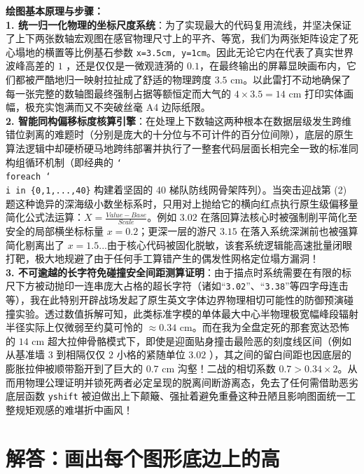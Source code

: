 {\small\color{blue!70!black}
\textbf{绘图基本原理与步骤：}\\
\textbf{1. 统一归一化物理的坐标尺度系统}：为了实现最大的代码复用流线，并坚决保证了上下两张数轴宏观图在感官物理尺寸上的平齐、等宽，我们为两张矩阵设定了死心塌地的横置等比例基石参数 \texttt{x=3.5cm, y=1cm}。因此无论它内在代表了真实世界波峰高差的 $1$ ，还是仅仅是一微观涟漪的 $0.1$，在最终输出的屏幕显映画布内，它们都被严酷地归一映射拉扯成了舒适的物理跨度 $3.5\text{ cm}$。以此雷打不动地确保了每一张完整的数轴图最终强制占据等额恒定而大气的 $4 \times 3.5 = 14\text{ cm}$ 打印实体画幅，极充实饱满而又不突破丝毫 A4 边际纸限。\\
\textbf{2. 智能同构偏移标度核算引擎}：在处理上下数轴这两种根本在数据层级发生跨维错位剥离的难题时（分别是庞大的十分位与不可计件的百分位间隙），底层的原生算法逻辑中却硬桥硬马地跨纬部署并执行了一整套代码层面长相完全一致的标准同构组循环机制（即经典的 \texttt{\char`\\foreach \char`\\i in \{0,1,...,40\}} 构建着坚固的 40 梯队防线网骨架阵列）。当突击迎战第 (2) 题这种诡异的深海级小数坐标系时，只用对上抛给它的横向红点执行原生级偏移量简化公式法运算：$X = \frac{Value - Base}{Scale}$。例如 $3.02$ 在落回算法核心时被强制削平简化至安全的局部横坐标标量 $x = 0.2$；更深一层的游尺 $3.15$ 在落入系统深渊前也被强算简化剔离出了 $x = 1.5$...由于核心代码被固化脱敏，该套系统逻辑能高速批量闭眼打靶，极大地规避了由于任何手工算错产生的偶发性网格定位塌方漏洞！\\
\textbf{3. 不可逾越的长字符免碰撞安全间距测算证明}：由于描点时系统需要在有限的标尺下方被动抛印一连串庞大占格的超长字符（诸如“\texttt{3.02}”、“\texttt{3.38}”等四字母连击等），我在此特别开辟战场发起了原生英文字体边界物理相切可能性的防御预演碰撞实验。透过数值拆解可知，此类标准字模的单体最大中心半物理极宽幅峰段辐射半径实际上仅微弱至约莫可怜的 $\approx0.34\text{ cm}$。而在我为全盘定死的那套宽达恐怖的 $14\text{ cm}$ 超大拉伸骨骼模式下，即使是迎面贴身撞击最险恶的刻度线区间（例如从基准墙 $3$ 到相隔仅仅 $2$ 小格的紧随单位 $3.02$ ），其之间的留白间距也因底层的膨胀拉伸被顺带豁开到了巨大的 $0.7\text{ cm}$ 沟壑！二战的相切系数 $0.7 > 0.34\times2$。从而用物理公理证明并锁死两者必定呈现的脱离间断游离态，免去了任何需借助恶劣底层函数 \texttt{yshift} 被迫做出上下颠簸、强扯着避免重叠这种丑陋且影响图面统一工整规矩观感的难堪折中画风！
}


\newpage



\section{解答：画出每个图形底边上的高}

